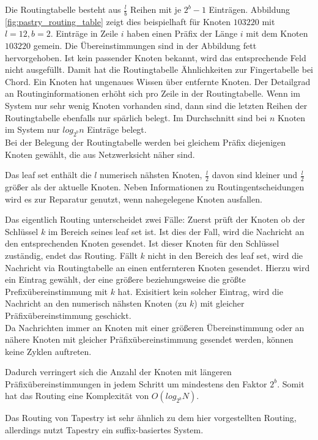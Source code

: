 Die Routingtabelle besteht aus $\frac{l}{b}$ Reihen mit je $2^b -1$ Einträgen. Abbildung \ref{fig:pastry_routing_table} zeigt dies beispielhaft für Knoten $103220$ mit $l=12, b=2$. Einträge in Zeile $i$ haben einen Präfix der Länge $i$ mit dem Knoten $103220$ gemein. Die Übereinstimmungen sind in der Abbildung fett hervorgehoben. Ist kein passender Knoten bekannt, wird das entsprechende Feld nicht ausgefüllt. Damit hat die Routingtabelle Ähnlichkeiten zur Fingertabelle bei Chord. Ein Knoten hat ungenaues Wissen über entfernte Knoten. Der Detailgrad an Routinginformationen erhöht sich pro Zeile in der Routingtabelle. Wenn im System nur sehr wenig Knoten vorhanden sind, dann sind die letzten Reihen der Routingtabelle ebenfalls nur spärlich belegt. Im Durchschnitt sind bei $n$ Knoten im System nur $log_{2^b} n$ Einträge belegt.\\
Bei der Belegung der Routingtabelle werden bei gleichem Präfix diejenigen Knoten gewählt, die aus Netzwerksicht näher sind.

Das leaf set enthält die $l$ numerisch nähsten Knoten, $\frac{l}{2}$ davon sind kleiner und $\frac{l}{2}$ größer als der aktuelle Knoten. Neben Informationen zu Routingentscheidungen wird es zur Reparatur genutzt, wenn nahegelegene Knoten ausfallen.

Das eigentlich Routing unterscheidet zwei Fälle: Zuerst prüft der Knoten ob der Schlüssel $k$ im Bereich seines leaf set ist. Ist dies der Fall, wird die Nachricht an den entsprechenden Knoten gesendet. Ist dieser Knoten für den Schlüssel zuständig, endet das Routing. Fällt $k$ nicht in den Bereich des leaf set, wird die Nachricht via Routingtabelle an einen entfernteren Knoten gesendet. Hierzu wird ein Eintrag gewählt, der eine größere beziehungsweise die größte Prefixübereinstimmung mit $k$ hat. Exisitiert kein solcher Eintrag, wird die Nachricht an den numerisch nähsten Knoten (zu $k$) mit gleicher Präfixübereinstimmung geschickt.\\
Da Nachrichten immer an Knoten mit einer größeren Übereinstimmung oder an nähere Knoten mit gleicher Präfixübereinstimmung gesendet werden, können keine Zyklen auftreten.

Dadurch verringert sich die Anzahl der Knoten mit längeren Präfixübereinstimmungen in jedem Schritt um mindestens den Faktor $2^b$. Somit hat das Routing eine Komplexität von $O(log_{2^b} N)$.

Das Routing von Tapestry ist sehr ähnlich zu dem hier vorgestellten Routing, allerdings nutzt Tapestry ein suffix-basiertes System.

